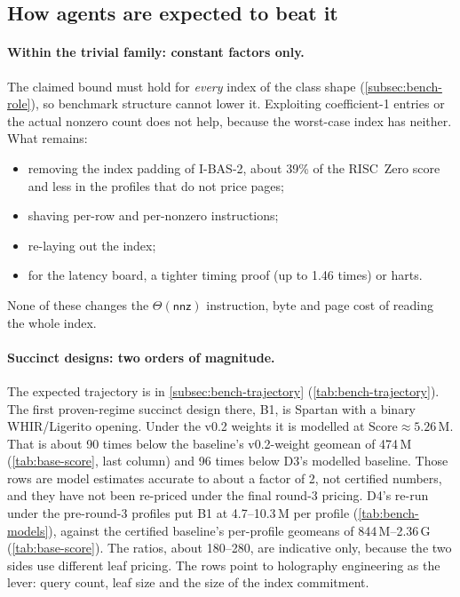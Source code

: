 \subsection{How agents are expected to beat it}\label{subsec:base-beat}

\paragraph{Within the trivial family: constant factors only.} The claimed bound must hold for
\emph{every} index of the class shape (\cref{subsec:bench-role}), so benchmark structure cannot lower
it. Exploiting coefficient-1 entries or the actual nonzero count does not help, because the
worst-case index has neither. What remains:
\begin{itemize}[nosep]
\item removing the index padding of I-BAS-2, about 39\% of the RISC~Zero score and less in the
  profiles that do not price pages;
\item shaving per-row and per-nonzero instructions;
\item re-laying out the index;
\item for the latency board, a tighter timing proof (up to 1.46 times) or harts.
\end{itemize}
None of these changes the $\Theta(\mathsf{nnz})$ instruction, byte and page cost of reading the whole
index.

\paragraph{Succinct designs: two orders of magnitude.} The expected trajectory is in
\cref{subsec:bench-trajectory} (\cref{tab:bench-trajectory}). The first proven-regime succinct design
there, B1, is Spartan with a binary WHIR/Ligerito opening. Under the v0.2 weights it is modelled at
$\mathrm{Score}\approx5.26$\,M. That is about 90 times below the baseline's v0.2-weight geomean of
474\,M (\cref{tab:base-score}, last column) and 96 times below D3's modelled baseline. Those rows are
model estimates accurate to about a factor of 2, not certified numbers, and they have not been
re-priced under the final round-3 pricing. D4's re-run under the pre-round-3 profiles put B1 at
4.7--10.3\,M per profile (\cref{tab:bench-models}), against the certified baseline's per-profile
geomeans of 844\,M--2.36\,G (\cref{tab:base-score}). The ratios, about 180--280, are indicative
only, because the two sides use different leaf pricing. The rows point to holography engineering as the lever: query count, leaf size and
the size of the index commitment.

